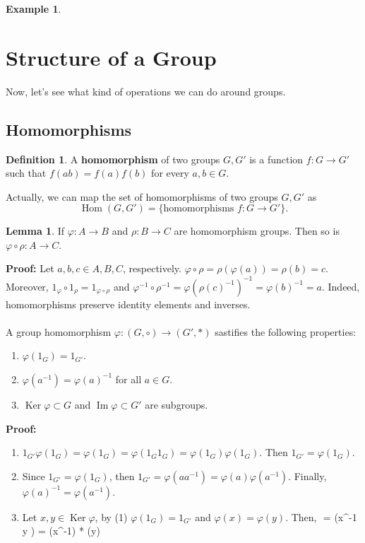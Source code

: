 \documentclass[11pt]{amsbook}%
\newcommand{\ii}{\item}
\theoremstyle{plain}
\theoremstyle{definition}
\newtheorem{definition*}{Definition}
\newtheorem*{example*}{Example}
\newtheorem{lemma}{Lemma}
\numberwithin{equation}{section}
\DeclareMathOperator{\Hom}{Hom}
\DeclareMathOperator{\Ker}{Ker}
\DeclareMathOperator{\im}{Im}
\begin{document}
\begin{example*}
\section{Structure of a Group}
\label{sect-structure-group}
Now, let's see what kind of operations we can do around groups.

\subsection{Homomorphisms}

\begin{definition*}
  \label{def-homomorphism}
  A \textbf{homomorphism} of two groups $G, G'$ is a function $f: G \longrightarrow G'$ such that
  $f(ab) = f(a)f(b)$ for every $a, b \in G$.
\end{definition*}
Actually, we can map the set of homomorphisms of two groups $G, G'$ as
$$
\Hom(G, G')  = \{\text{homomorphisms } f: G \longrightarrow G' \}.
$$
\begin{lemma}
  If $\varphi: A \longrightarrow B$ and $\rho: B \longrightarrow C$ are homomorphism groups.
  Then so is $\varphi \circ \rho: A \longrightarrow C$.
\end{lemma} \vspace{1.8em}
\textbf{Proof: }Let $a, b, c \in A, B, C$, respectively. $\varphi \circ \rho = \rho(\varphi(a)) = \rho(b) = c$.
Moreover, $1_{\varphi} \circ 1_{\rho} = 1_{\varphi \circ \rho}$ and
$\varphi^{-1} \circ \rho^{-1} = \varphi(\rho(c)^{-1})^{-1} = \varphi(b)^{-1} = a$.
Indeed, homomorphisms preserve identity elements and inverses. \qedsymbol \\ \\
A group homomorphism $\varphi: (G, \circ) \longrightarrow (G', *)$ sastifies the following properties:
\begin{enumerate}[1. ]
    \ii $\varphi(1_{G}) = 1_{G'}$.
    \ii $\varphi(a^{-1}) = \varphi(a)^{-1}$ for all $a \in G$.
    \ii $\Ker \varphi \subset G$ and $\im \varphi \subset G'$ are subgroups.
\end{enumerate}
\textbf{Proof: }
\begin{enumerate}[(1). ]
    \ii $1_{G'}\varphi(1_{G}) = \varphi(1_{G}) = \varphi(1_{G}1_{G}) = \varphi(1_{G})\varphi(1_{G})$.
    Then $1_{G'} = \varphi(1_{G})$. 
    \ii Since $1_{G'} = \varphi(1_{G})$, then $1_{G'} = \varphi(aa^{-1}) = \varphi(a)\varphi(a^{-1})$.
    Finally, $\varphi(a)^{-1} = \varphi(a^{-1})$. 
    \ii Let $x, y \in \Ker \varphi$, by (1) $\varphi(1_{G}) = 1_{G'}$ and 
    $\varphi(x) = \varphi(y)$. Then,
    $$
    = \varphi(x^{-1} \circ y ) = \varphi(x^{-1}) * \varphi(y) \\


\end{enumerate}
\end{example*}
\end{document}
